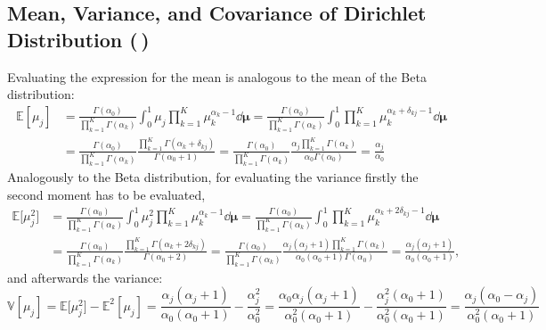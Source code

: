 \documentclass[11pt, a4paper]{scrartcl}
\newcommand{\E}{\mathbb{E}}
\newcommand{\Var}{\mathbb{V}}
\renewcommand{\vec}[1]{\bm{#1}}
\newcommand{\diffstar}{\texorpdfstring{\raisebox{-1pt}{\resizebox{!}{8pt}{\(\star\)}}}{*}}
\newcommand{\twostar}  {(\diffstar\,\diffstar)}
\begin{document}
		\subsection{Mean, Variance, and Covariance of Dirichlet Distribution  \twostar}
			Evaluating the expression for the mean is analogous to the mean of the Beta distribution:
			\begin{align}
				\E[\mu_j]
					&= \frac{\Gamma(\alpha_0)}{\prod_{k = 1}^{K} \Gamma(\alpha_k)} \int_{0}^{1}\! \mu_j \prod_{k = 1}^{K} \mu_k^{\alpha_k - 1} \dd{\vec{\mu}}
					 = \frac{\Gamma(\alpha_0)}{\prod_{k = 1}^{K} \Gamma(\alpha_k)} \int_{0}^{1}\! \prod_{k = 1}^{K} \mu_k^{\alpha_k + \delta_{kj} - 1} \dd{\vec{\mu}} \\
					&= \frac{\Gamma(\alpha_0)}{\prod_{k = 1}^{K} \Gamma(\alpha_k)} \frac{\prod_{k = 1}^{K} \Gamma(\alpha_k + \delta_{kj})}{\Gamma(\alpha_0 + 1)}
					 = \frac{\Gamma(\alpha_0)}{\prod_{k = 1}^{K} \Gamma(\alpha_k)} \frac{\alpha_j \prod_{k = 1}^{K} \Gamma(\alpha_k)}{\alpha_0 \Gamma(\alpha_0)}
					 = \frac{\alpha_j}{\alpha_0}
			\end{align}
			Analogously to the Beta distribution, for evaluating the variance firstly the second moment has to be evaluated,
			\begin{align}
				\E\big[\mu_j^2\big]
					&= \frac{\Gamma(\alpha_0)}{\prod_{k = 1}^{K} \Gamma(\alpha_k)} \int_{0}^{1}\! \mu_j^2 \prod_{k = 1}^{K} \mu_k^{\alpha_k - 1} \dd{\vec{\mu}}
					 = \frac{\Gamma(\alpha_0)}{\prod_{k = 1}^{K} \Gamma(\alpha_k)} \int_{0}^{1}\! \prod_{k = 1}^{K} \mu_k^{\alpha_k + 2\delta_{kj} - 1} \dd{\vec{\mu}} \\
					&= \frac{\Gamma(\alpha_0)}{\prod_{k = 1}^{K} \Gamma(\alpha_k)} \frac{\prod_{k = 1}^{K} \Gamma(\alpha_k + 2\delta_{kj})}{\Gamma(\alpha_0 + 2)}
					 = \frac{\Gamma(\alpha_0)}{\prod_{k = 1}^{K} \Gamma(\alpha_k)} \frac{\alpha_j (\alpha_j + 1) \prod_{k = 1}^{K} \Gamma(\alpha_k)}{\alpha_0 (\alpha_0 + 1) \Gamma(\alpha_0)}
					 = \frac{\alpha_j (\alpha_j + 1)}{\alpha_0 (\alpha_0 + 1)},
			\end{align}
			and afterwards the variance:
			\begin{equation}
				\Var[\mu_j]
					= \E\big[\mu_j^2\big] - \E^2[\mu_j]
					= \frac{\alpha_j (\alpha_j + 1)}{\alpha_0 (\alpha_0 + 1)} - \frac{\alpha_j^2}{\alpha_0^2}
					= \frac{\alpha_0 \alpha_j (\alpha_j + 1)}{\alpha_0^2 (\alpha_0 + 1)} - \frac{\alpha_j^2 (\alpha_0 + 1)}{\alpha_0^2 (\alpha_0 + 1)}
					= \frac{\alpha_j (\alpha_0- \alpha_j)}{\alpha_0^2 (\alpha_0 + 1)}
			\end{equation}
\end{document}
